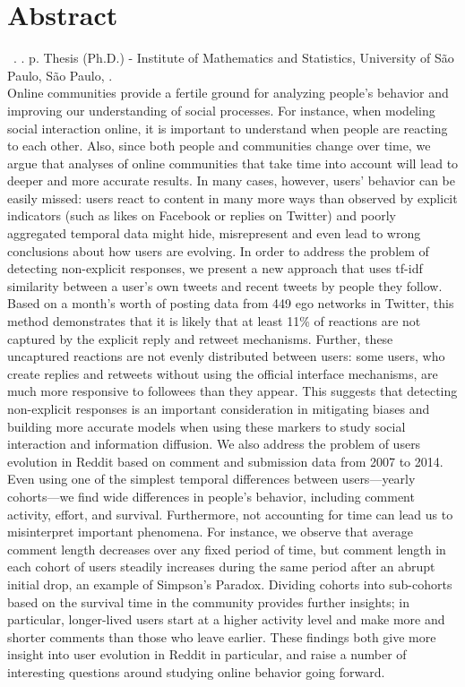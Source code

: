 \documentclass[11pt,twoside,a4paper]{book}
\begin{document}
\chapter*{Abstract}
\noindent \surnameAbbr~\textbf{\phdTitle}.
\thesisYear. \thesisPages p. Thesis (Ph.D.) - Institute of Mathematics and Statistics,
University of São Paulo, São Paulo, \thesisYear.
\\


Online communities provide a fertile ground for analyzing people’s behavior and improving our understanding of social processes. For instance, when modeling social interaction online, it is important to understand when people are reacting to each other. Also, since both people and communities change over time, we argue that analyses of online communities that take time into account will lead to deeper and more accurate results. In many cases, however, users’ behavior can be easily missed: users react to content in many more ways than observed by explicit indicators (such as likes on Facebook or replies on Twitter) and poorly aggregated temporal data might hide, misrepresent and even lead to wrong conclusions about how users are evolving. In order to address the problem of detecting non-explicit responses, we present a new approach that uses tf-idf similarity between a user’s own tweets and recent tweets by people they follow. Based on a month’s worth of posting data from 449 ego networks in Twitter, this method demonstrates that it is likely that at least 11\% of reactions are not captured by the explicit reply and retweet mechanisms. Further, these uncaptured reactions are not evenly distributed between users: some users, who create replies and retweets without using the official interface mechanisms, are much more responsive to followees than they appear. This suggests that detecting non-explicit responses is an important consideration in mitigating biases and building more accurate models when using these markers to study social interaction and information diffusion. We also address the problem of users evolution in Reddit based on comment and submission data from 2007 to 2014. Even using one of the simplest temporal differences between users—yearly cohorts—we find wide differences in people’s behavior, including comment activity, effort, and survival. Furthermore, not accounting for time can lead us to misinterpret important phenomena. For instance, we observe that average comment length decreases over any fixed period of time, but comment length in each cohort of users steadily increases during the same period after an abrupt initial drop, an example of Simpson’s Paradox. Dividing cohorts into sub-cohorts based on the survival time in the community provides further insights; in particular, longer-lived users start at a higher activity level and make more and shorter comments than those who leave earlier. These findings both give more insight into user evolution in Reddit in particular, and raise a number of interesting questions around studying online behavior going forward.
\\
\end{document}
